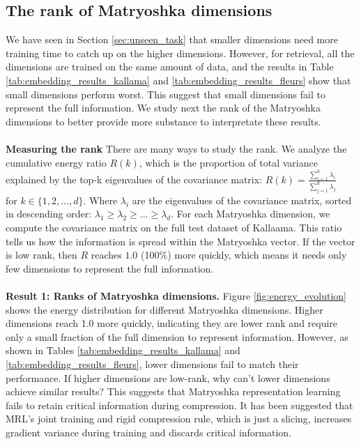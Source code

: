 \documentclass[11pt]{article}
\newcommand{\myparagraph}[1]{\noindent\textbf{#1}}
\begin{document}
\subsection{The rank of Matryoshka dimensions}
We have seen in Section \ref{sec:unseen_task} that smaller dimensions need more training time to catch up on the higher dimensions. However, for retrieval, all the dimensions are trained on the same amount of data, and the results in Table \ref{tab:embedding_results_kallama} and \ref{tab:embedding_results_fleurs} show that small dimensions perform worst. This suggest that small dimensions fail to represent the full information. We study next the rank of the Matryoshka dimensions to better provide more substance to interpretate these results.
\\
\\
\myparagraph{Measuring the rank} There are many ways to study the rank. We analyze the cumulative energy ratio $R(k)$, which is the proportion of total variance explained by the top-k eigenvalues of the covariance matrix: $R(k) = \frac{\sum_{i=1}^{k} \lambda_i}{\sum_{j=1}^{d} \lambda_j}$ $\text{for } k \in \{1, 2, \ldots, d\}$. Where $\lambda_i$ are the eigenvalues of the covariance matrix, sorted in descending order: $\lambda_1 \geq \lambda_2 \geq \ldots \geq \lambda_d$. For each Matryoshka dimension, we compute the covariance matrix on the full test dataset of Kallaama. This ratio tells us how the information is spread within the Matryoshka vector. If the vector is low rank, then $R$ reaches $1.0$ (100\%) more quickly, which means it needs only few dimensions to represent the full information.
\\
\\
\myparagraph{Result 1: Ranks of Matryoshka dimensions.} Figure \ref{fig:energy_evolution} shows the energy distribution for different Matryoshka dimensions. Higher dimensions reach 1.0 more quickly, indicating they are lower rank and require only a small fraction of the full dimension to represent information. However, as shown in Tables \ref{tab:embedding_results_kallama} and \ref{tab:embedding_results_fleurs}, lower dimensions fail to match their performance. If higher dimensions are low-rank, why can't lower dimensions achieve similar results? This suggests that Matryoshka representation learning fails to retain critical information during compression. It has been suggested \citep{zhang-etal-2025-smec, wen2025Matryoshkarevisitingsparsecoding} that MRL's joint training and rigid compression rule, which is just a slicing, increases gradient variance during training and discards critical information.
\end{document}
